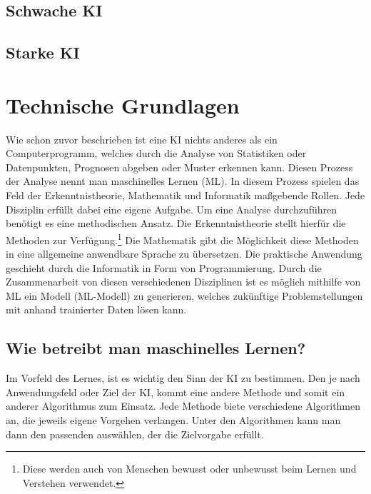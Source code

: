 \documentclass[12pt,german,ngerman]{report}
\begin{document}
    \section{Schwache KI}
    
    \section{Starke KI}

\chapter{Technische Grundlagen}
     Wie schon zuvor beschrieben ist eine KI nichts anderes als ein Computerprogramm,
     welches durch die Analyse von Statistiken oder Datenpunkten, Prognosen abgeben oder Muster erkennen kann.
     Diesen Prozess der Analyse nennt man maschinelles Lernen (ML).
     In diesem Prozess spielen das Feld der Erkenntnistheorie, Mathematik und Informatik 
     maßgebende Rollen. Jede Disziplin erfüllt dabei eine eigene Aufgabe.
     Um eine Analyse durchzuführen benötigt es eine methodischen Ansatz.
     Die Erkenntnistheorie stellt hierfür die Methoden zur Verfügung.\footnote{Diese werden auch von 
     Menschen bewusst oder unbewusst beim Lernen und Verstehen verwendet.}
     Die Mathematik gibt die Möglichkeit diese Methoden in eine allgemeine anwendbare Sprache zu übersetzen.
     Die praktische Anwendung geschieht durch die Informatik in Form von Programmierung.
     Durch die Zusammenarbeit von diesen verschiedenen Disziplinen ist es
     möglich mithilfe von ML ein Modell (ML-Modell) zu generieren,
     welches zukünftige Problemstellungen mit anhand trainierter Daten lösen kann.
        
    \section{Wie betreibt man maschinelles Lernen?}
        Im Vorfeld des Lernes, ist es wichtig den Sinn der KI zu bestimmen.
        Den je nach Anwendungsfeld oder Ziel der KI, kommt eine andere Methode und somit
        ein anderer Algorithmus zum Einsatz. Jede Methode biete verschiedene Algorithmen
        an, die jeweils eigene Vorgehen verlangen. Unter den Algorithmen kann man
        dann den passenden auswählen, der die Zielvorgabe erfüllt.
\end{document}
